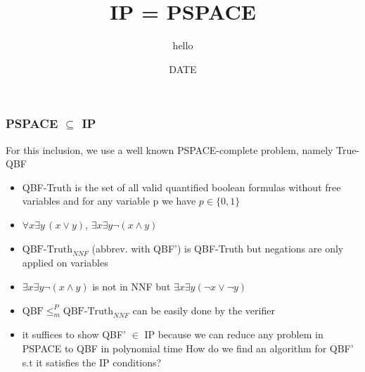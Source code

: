 \documentclass[hyperref={pdfpagelabels=false},t,10pt]{beamer}
\title{IP = PSPACE}
\author[© author]{hello}
\institute{Technische Universit\"at Dresden}
\date{DATE}
\begin{document}
\addtocounter{framenumber}{-1}
\maketitle

\begin{frame}
  \frametitle{PSPACE $\subseteq$ IP}
  For this inclusion, we use a well known PSPACE-complete problem, namely True-QBF
  \pause
  \begin{itemize}
  \item QBF-Truth is the set of all valid quantified boolean formulas without free variables and for any variable p we have $p\in \{0,1\}$
  \pause
  \item $\forall x \exists y \, (x \lor y)$, $\exists x \exists y \neg(x \land y)$
  \pause
  \item $\mbox{QBF-Truth}_{NNF}$ (abbrev. with QBF') is QBF-Truth but negations are only applied on variables
  \item $\exists x \exists y \neg(x\land y)$ is not in NNF but $\exists x \exists y (\neg x \lor \neg y)$
  \pause
  \item $\mbox{QBF} \leq^P_m \mbox{QBF-Truth}_{NNF}$ can be easily done by the verifier 
  \item it suffices to show QBF' $\in$ IP because we can reduce any problem in PSPACE to QBF in polynomial time \newline \newline
  How do we find an algorithm for QBF' s.t it satisfies the IP conditions?

  \end{itemize}
\end{frame}
\end{document}
